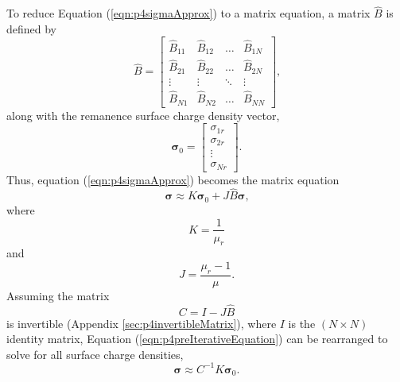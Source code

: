 To reduce Equation (\ref{eqn:p4sigmaApprox}) to a matrix equation, a matrix \(\hat{B}\) is defined by
\begin{equation}
    \hat{B} = \begin{bmatrix} \hat{B}_{11} & \hat{B}_{12} & \dots & \hat{B}_{1N} \\
    \hat{B}_{21} & \hat{B}_{22} & \dots & \hat{B}_{2N} \\
    \vdots & \vdots & \ddots & \vdots \\
    \hat{B}_{N1} & \hat{B}_{N2} & \dots & \hat{B}_{NN} \end{bmatrix} \nonumber \text{,}
\end{equation}
along with the remanence surface charge density vector,
\begin{equation}
    \bm{\sigma}_0 = \begin{bmatrix} \sigma_{1r} \\ \sigma_{2r} \\ \vdots \\ \sigma_{Nr} \end{bmatrix} \text{.}
\end{equation}
Thus, equation (\ref{eqn:p4sigmaApprox}) becomes the matrix equation
\begin{equation}\label{eqn:p4preIterativeEquation}
    \bm{\sigma} \approx K \bm{\sigma}_0 + J \hat{B} \bm{\sigma} \text{,}
\end{equation}
where
\begin{equation}
    K = \frac{1}{\mu_r}
\end{equation}
and
\begin{equation}
    J = \frac{\mu_r - 1}{\mu} \text{.}
\end{equation}
Assuming the matrix
\begin{equation}\label{eqn:p4CEquation}
    C = I - J \hat{B}
\end{equation}
is invertible (Appendix \ref{sec:p4invertibleMatrix}), where \(I\) is the \(\left(N\times N\right)\) identity matrix, Equation (\ref{eqn:p4preIterativeEquation}) can be rearranged to solve for all surface charge densities,
\begin{equation}\label{eqn:p4sigma}
    \bm{\sigma} \approx C ^{-1} K \bm{\sigma}_0 \text{.}
\end{equation}

